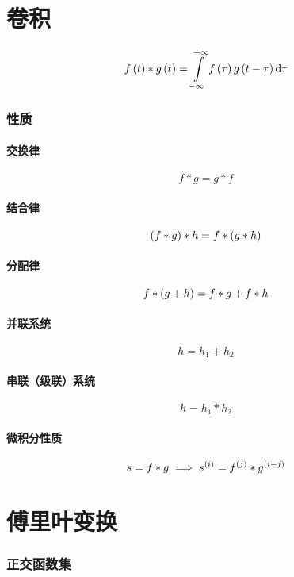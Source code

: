 \documentclass{article}
\begin{document}
\part{卷积}

\[\ft\ast g\p{t}
    =\impint
    f\p{\tau}g\p{t-\tau}\d\tau\]

\section{性质\label{连续卷积性质}}

\subsection{交换律}

\[f\ast g=g\ast f\]

\subsection{结合律}

\[\left(f\ast g\right)\ast h=f\ast\left(g\ast h\right)\]

\subsection{分配律}

\[f\ast\left(g+h\right)=f\ast g+f\ast h\]

\subsection{并联系统}

\[h=h_1+h_2\]

\subsection{串联（级联）系统}

\[h=h_1\ast h_2\]

\subsection{微积分性质}

\[s=f\ast g\implies s^{\left(i\right)}=f^{\left(j\right)}\ast g^{\left(i-j\right)}\]

\part{傅里叶变换}

\section{正交函数集}
\end{document}

